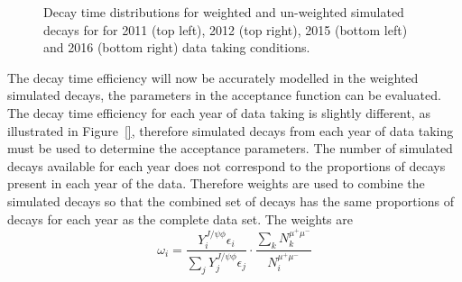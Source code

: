 \begin{figure}[htbp]
  \caption{Decay time distributions for weighted and un-weighted \bsmumu simulated decays for for 2011 (top left), 2012 (top right), 2015 (bottom left) and 2016 (bottom right) data taking conditions.}
  \label{fig:BsTomumu_weightDecayTime}
\end{figure}


The decay time efficiency will now be accurately modelled in the weighted simulated \bsmumu decays, the parameters in the acceptance function can be evaluated. The decay time efficiency for each year of data taking is slightly different, as illustrated in Figure~\ref{}, therefore simulated decays from each year of data taking must be used to determine the acceptance parameters. The number of simulated decays available for each year does not correspond to the proportions of decays present in each year of the data. Therefore weights are used to combine the simulated decays so that the combined set of decays has the same proportions of decays for each year as the complete data set. The weights are
\begin{equation}
\omega_{i}  = \frac{Y_{i}^{J/\psi \phi} \epsilon_{i}}{\displaystyle\sum_{j} Y_{j}^{J/\psi \phi} \epsilon_{j}} \cdot \frac{\displaystyle\sum_{k} N_{k}^{\mu^{+}\mu^{-}}}{N_{i}^{\mu^{+}\mu^{-}}}
\end{equation}
